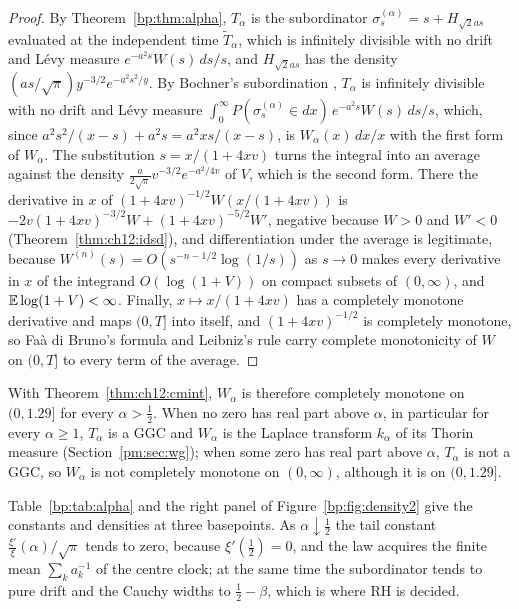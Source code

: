 \begin{proof}
By Theorem~\ref{bp:thm:alpha}, $T_\alpha$ is the subordinator $\sigma^{(\alpha)}_s=s+H_{\sqrt2as}$ evaluated at the independent time $\widetilde T_\alpha$, which is infinitely divisible with no drift and L\'evy measure $e^{-a^2s}W(s)\,ds/s$, and $H_{\sqrt2as}$ has the density $(as/\sqrt\pi)y^{-3/2}e^{-a^2s^2/y}$. By Bochner's subordination \cite[Theorem 30.1]{Sato99}, $T_\alpha$ is infinitely divisible with no drift and L\'evy measure $\int_0^\infty P(\sigma^{(\alpha)}_s\in dx)\,e^{-a^2s}W(s)\,ds/s$, which, since $a^2s^2/(x-s)+a^2s=a^2xs/(x-s)$, is $W_\alpha(x)\,dx/x$ with the first form of $W_\alpha$. The substitution $s=x/(1+4xv)$ turns the integral into an average against the density $\frac a{2\sqrt\pi}v^{-3/2}e^{-a^2/4v}$ of $V$, which is the second form. There the derivative in $x$ of $(1+4xv)^{-1/2}W(x/(1+4xv))$ is $-2v(1+4xv)^{-3/2}W+(1+4xv)^{-5/2}W'$, negative because $W>0$ and $W'<0$ (Theorem~\ref{thm:ch12:idsd}), and differentiation under the average is legitimate, because $W^{(n)}(s)=O(s^{-n-1/2}\log(1/s))$ as $s\to0$ makes every derivative in $x$ of the integrand $O(\log(1+V))$ on compact subsets of $(0,\infty)$, and $\mathbb{E}\log(1+V)<\infty$. Finally, $x\mapsto x/(1+4xv)$ has a completely monotone derivative and maps $(0,T]$ into itself, and $(1+4xv)^{-1/2}$ is completely monotone, so Fa\`a di Bruno's formula and Leibniz's rule carry complete monotonicity of $W$ on $(0,T]$ to every term of the average.
\end{proof}

With Theorem~\ref{thm:ch12:cmint}, $W_\alpha$ is therefore completely monotone on $(0,1.29]$ for every $\alpha>\frac12$. When no zero has real part above $\alpha$, in particular for every $\alpha\ge1$, $T_\alpha$ is a GGC and $W_\alpha$ is the Laplace transform $k_\alpha$ of its Thorin measure (Section~\ref{pm:sec:wg}); when some zero has real part above $\alpha$, $T_\alpha$ is not a GGC, so $W_\alpha$ is not completely monotone on $(0,\infty)$, although it is on $(0,1.29]$.

Table~\ref{bp:tab:alpha} and the right panel of Figure~\ref{bp:fig:density2} give the constants and densities at three basepoints. As $\alpha\downarrow\frac12$ the tail constant $\frac{\xi'}{\xi}(\alpha)/\sqrt\pi$ tends to zero, because $\xi'(\frac12)=0$, and the law acquires the finite mean $\sum_ka_k^{-1}$ of the centre clock; at the same time the subordinator tends to pure drift and the Cauchy widths to $\frac12-\beta$, which is where RH is decided.

